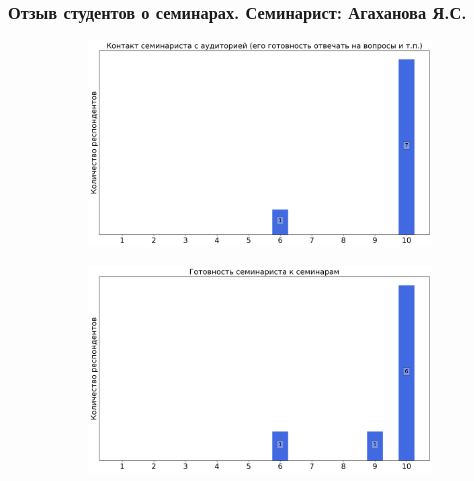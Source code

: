     \subsubsection{Отзыв студентов о семинарах. Семинарист: Агаханова Я.С.}
        \begin{figure}[H]
            \centering
            \begin{subfigure}[b]{0.45\textwidth}
                \centering
                \includegraphics[width=\textwidth]{images/1 course/Аналитическая геометрия/seminarists-marks-Агаханова Я.С.-0.png}
            \end{subfigure}
            \begin{subfigure}[b]{0.45\textwidth}
                \centering
                \includegraphics[width=\textwidth]{images/1 course/Аналитическая геометрия/seminarists-marks-Агаханова Я.С.-1.png}
            \end{subfigure}
            \begin{subfigure}[b]{0.45\textwidth}
                \centering

\end{subfigure}
\end{figure}
